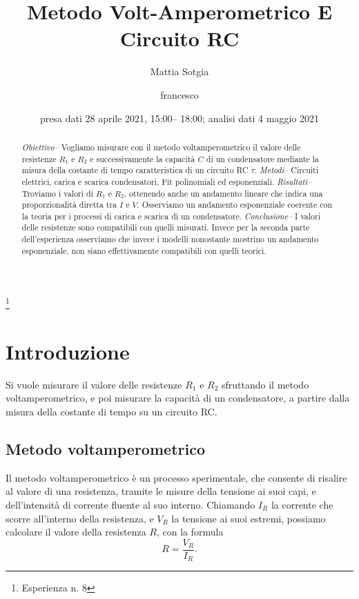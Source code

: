 \documentclass[
    reprint, 
    superscriptaddress, 
    altaffilletter, 
    amsmath, 
    amssymb, 
    a4paper
]{revtex4-2}
\begin{document}
\title{Metodo Volt-Amperometrico E Circuito RC}
\thanks{Esperienza n. 8}

\author{Mattia Sotgia}
\author{francesco}

\date{presa dati
28 aprile 2021, 15:00– 18:00; analisi dati 
4 maggio 2021}

\begin{abstract}
    \textit{Obiettivo-- }
    Vogliamo misurare con il metodo voltamperometrico il valore delle resistenze $R_1$ e $R_2$ e successivamente la capacità $C$ di un condensatore mediante la misura della costante di tempo caratteristica di un circuito RC $\tau$.
    \textit{Metodi-- }
    Circuiti elettrici, carica e scarica condensatori, Fit polinomiali ed esponenziali. 
    \textit{Risultati-- }
    Troviamo i valori di $R_1$ e $R_2$, ottenendo anche un andamento lineare che indica una proporzionalità diretta tra $I$ e $V$. Osserviamo un andamento esponenziale coerente con la teoria per i processi di carica e scarica di un condensatore.
    \textit{Conclusione-- }
    I valori delle resistenze sono compatibili con quelli misurati. Invece per la seconda parte dell'esperienza osserviamo che invece i modelli nonostante mostrino un andamento esponenziale, non siano effettivamente compatibili con quelli teorici.
\end{abstract}
\maketitle
\thispagestyle{fancy}

\section{Introduzione}
    \label{section:introduction}

    Si vuole misurare il valore delle resistenze $R_1$ e $R_2$ sfruttando il metodo voltamperometrico, e poi misurare la capacità di un condensatore, a partire dalla misura della costante di tempo su un circuito RC. 

    \subsection{Metodo voltamperometrico}

    Il metodo voltamperometrico è un processo sperimentale, che consente di risalire al valore di una resistenza, tramite le misure della tensione ai suoi capi, e dell’intensità di corrente fluente al suo interno. Chiamando $I_R$ la corrente che scorre all’interno della resistenza, e $V_R$ la tensione ai suoi estremi, possiamo calcolare il valore della resistenza $R$, con la formula \[R=\frac{V_R}{I_R}.\]
\end{document}
